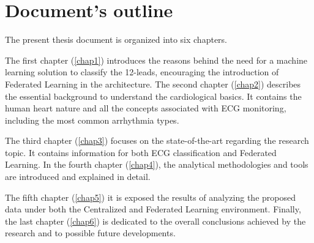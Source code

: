 

\section{Document's outline} \label{doc_struct}

The present thesis document is organized into six chapters. 

The first chapter (\ref{chap1}) introduces the reasons behind the need for a machine learning solution to classify the 12-leads, encouraging the introduction of Federated Learning in the architecture. The second chapter (\ref{chap2}) describes the essential background to understand the cardiological basics. It contains the human heart nature and all the concepts associated with ECG monitoring, including the most common arrhythmia types.

The third chapter (\ref{chap3}) focuses on the state-of-the-art regarding the research topic. It contains information for both ECG classification and Federated Learning. In the fourth chapter (\ref{chap4}), the analytical methodologies and tools are introduced and explained in detail. 

The fifth chapter (\ref{chap5}) it is exposed the results of analyzing the proposed data under both the Centralized and Federated Learning environment. Finally, the last chapter (\ref{chap6}) is dedicated to the overall conclusions achieved by the research and to possible future developments.